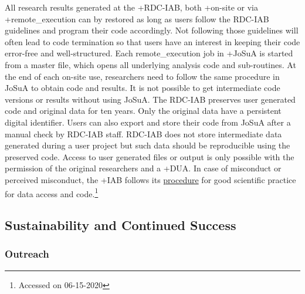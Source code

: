 \documentclass[
]{WileySix}
\begin{document}
All research results generated at the +RDC-IAB\textbar, both +on-site\textbar{} or via +remote\_execution\textbar{} can by restored as long as users follow the RDC-IAB guidelines and program their code accordingly. Not following those guidelines will often lead to code termination so that users have an interest in keeping their code error-free and well-structured. Each remote\_execution job in +JoSuA\textbar{} is started from a master file, which opens all underlying analysis code and sub-routines. At the end of each on-site use, researchers need to follow the same procedure in JoSuA to obtain code and results. It is not possible to get intermediate code versions or results without using JoSuA. The RDC-IAB preserves user generated code and original data for ten years. Only the original data have a persistent digital identifier. Users can also export and store their code from JoSuA after a manual check by RDC-IAB staff. RDC-IAB does not store intermediate data generated during a user project but such data should be reproducible using the preserved code. Access to user generated files or output is only possible with the permission of the original researchers and a +DUA\textbar. In case of misconduct or perceived misconduct, the +IAB\textbar{} follows its \href{https://www.iab.de/en/daten/replikationen.aspx}{procedure} for good scientific practice for data access and code.\footnote{Accessed on 06-15-2020}

\hypertarget{sustainability-and-continued-success}{%
\subsection{Sustainability and Continued Success}\label{sustainability-and-continued-success}}

\hypertarget{outreach}{%
\subsubsection{Outreach}\label{outreach}}
\end{document}
